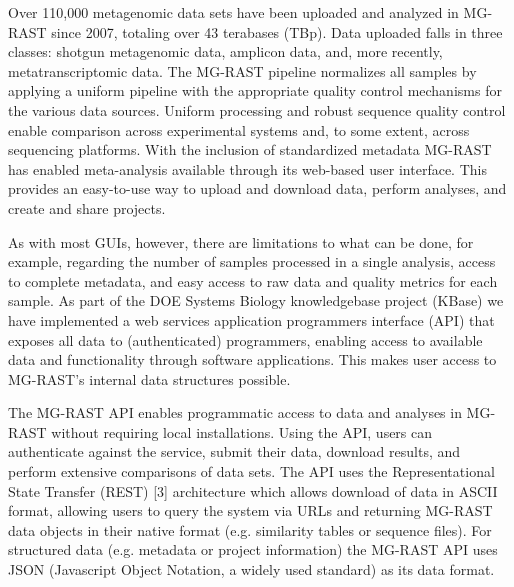 


Over 110,000 metagenomic data sets have been uploaded and analyzed in MG-RAST since 2007, totaling over 43 terabases (TBp). Data uploaded falls in three classes: shotgun metagenomic data, amplicon data, and, more recently, metatranscriptomic data. The MG-RAST pipeline normalizes all samples by applying a uniform pipeline with the appropriate quality control mechanisms for the various data sources. Uniform processing and robust sequence quality control enable comparison across experimental systems and, to some extent, across sequencing platforms. With the inclusion of standardized metadata MG-RAST has enabled meta-analysis available through its web-based user interface. This provides an easy-to-use way to upload and download data, perform analyses, and create and share projects.

As with most GUIs, however, there are limitations to what can be done, for example, regarding the number of samples processed in a single analysis, access to complete metadata, and easy access to raw data and quality metrics for each sample. As part of the DOE Systems Biology knowledgebase project (KBase) we have implemented a web services application programmers interface (API) that exposes all data to (authenticated) programmers, enabling access to available data and functionality through software applications. This makes user access to MG-RAST's internal data structures possible. 

The MG-RAST API enables programmatic access to data and analyses in MG-RAST without requiring local installations. Using the API, users can authenticate against the service, submit their data, download results, and perform extensive comparisons of data sets. The API uses the Representational State Transfer (REST) [3] architecture which allows download of data in ASCII format, allowing users to query the system via URLs and returning MG-RAST data objects in their native format (e.g. similarity tables or sequence files). For structured data (e.g. metadata or project information) the MG-RAST API uses JSON (Javascript Object Notation, a widely used standard) as its data format. 

